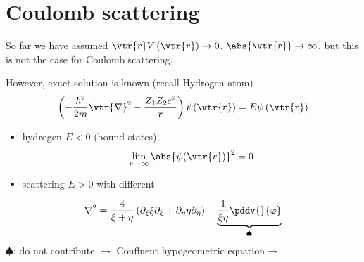 \section{Coulomb scattering}
So far we have assumed $\vtr{r} V\left( \vtr{r} \right)\rightarrow 0$, $\abs{\vtr{r}}\rightarrow \infty$, but this is not the case for Coulomb scattering.

However, exact solution is known (recall Hydrogen atom)
\begin{dmath}[]
	\left( -\frac{\hbar^2}{2m}\vtr{\nabla}^2-\frac{Z_1Z_2e^2}{r} \right)\psi(\vtr{r})=E\psi\left( \vtr{r} \right)
\end{dmath}
\begin{itemize}
	\item hydrogen $E<0$ (bound states), 
		\begin{dmath}[]
			\lim_{r\to \infty}\abs{\psi(\vtr{r})}^2=0
		\end{dmath}
	\item scattering $E>0$ with different
\end{itemize}
\begin{dmath}[]
	\nabla^2=\frac{4}{\xi+\eta}\left( \partial_{\xi}\xi\partial_{\xi}+\partial_{\eta}\eta\partial_{\eta} \right)+\underbrace{\frac{1}{\xi\eta}\pddv{}{\varphi}}_{\spadesuit}
\end{dmath}
$\spadesuit$: do not contribute
$\to$
Confluent hypogeometric equation$\to$

